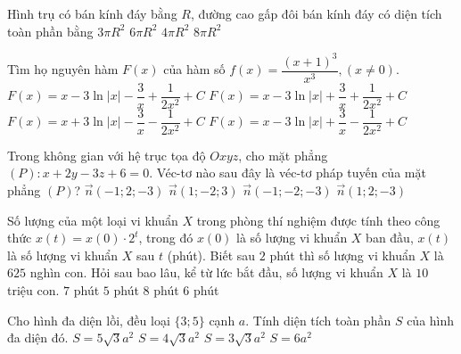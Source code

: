 	\begin{ex}%
		Hình trụ có bán kính đáy bằng $R$, đường cao gấp đôi bán kính đáy có diện tích toàn phần bằng
		\choice
		{$3\pi R^2$}
		{\True $6\pi R^2$}
		{$4\pi R^2$}
		{$8\pi R^2$}
	\end{ex}
	
	\begin{ex}%
		Tìm họ nguyên hàm $F(x)$ của hàm số $f(x)=\dfrac{{(x+1)}^3}{x^3},(x\neq 0)$.
		\choice
		{$F(x)=x-3\ln | x|-\dfrac{3}{x}+\dfrac{1}{2x^2}+C$}
		{$F(x)=x-3\ln | x|+\dfrac{3}{x}+\dfrac{1}{2x^2}+C$}
		{\True $F(x)=x+3\ln | x|-\dfrac{3}{x}-\dfrac{1}{2x^2}+C$}
		{$F(x)=x-3\ln | x|+\dfrac{3}{x}-\dfrac{1}{2x^2}+C$}
	\end{ex}
	
	\begin{ex}%
		Trong không gian với hệ trục tọa độ $Oxyz$, cho mặt phẳng $(P)\colon x+2y-3z+6=0$. Véc-tơ nào sau đây là véc-tơ pháp tuyến của mặt phẳng $(P)$?
		\choice
		{$\overrightarrow{n}(-1;2;-3)$}
		{$\overrightarrow{n}(1;-2;3)$}
		{$\overrightarrow{n}(-1;-2;-3)$}
		{\True $\overrightarrow{n}(1;2;-3)$}
	\end{ex}
	\begin{ex}%
		Số lượng của một loại vi khuẩn $X$ trong phòng thí nghiệm được tính theo công thức $x(t)=x(0)\cdot 2^t$, trong đó $x(0)$ là số lượng vi khuẩn $X$ ban đầu, $x(t)$ là số lượng vi khuẩn $X$ sau $t$ (phút). Biết sau $2$ phút thì số lượng vi khuẩn $X$ là $625$ nghìn con. Hỏi sau bao lâu, kể từ lức bắt đầu, số lượng vi khuẩn $X$ là $10$ triệu con.
		\choice
		{$7$ phút}
		{$5$ phút}
		{$8$ phút}
		{\True $6$ phút}
	\end{ex}
	
	\begin{ex}%
		Cho hình đa diện lồi, đều loại $\{3;5\}$ cạnh $a$. Tính diện tích toàn phần $S$ của hình đa diện đó.
		\choice
		{\True $S=5\sqrt{3}a^2$}
		{$S=4\sqrt{3}a^2$}
		{$S=3\sqrt{3}a^2$}
		{$S=6a^2$}
	\end{ex}
	
